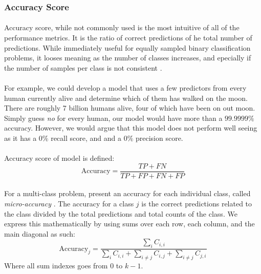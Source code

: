 \documentclass[12pt,letterpaper]{article}
\begin{document}

\subsubsection{Accuracy Score}

\paragraph*{}Accuracy score, while not commonly used is the most intuitive of all of the performance metrics. It is the ratio of correct predictions of he total number of predictions. While immediately useful for equally sampled binary classification problems, it looses meaning as the number of classes increases, and epecially if the number of samples per class is not consistent \cite{Geron}.

\paragraph*{}For example, we could develop a model that uses a few predictors from every human currently alive and determine which of them has walked on the moon. There are roughly 7 billion humans alive, four of which have been on out moon. Simply guess \textit{no} for every human, our model would have more than a $99.9999\%$ accuracy. However, we would argue that this model does not perform well seeing as it has a $0 \%$ recall score, and and a $0 \%$ precision score.

\paragraph*{}Accuracy score of model is defined:
\begin{equation}
\label{eqn-BinaryAccuracy}
\text{Accuracy} = \frac{TP + FN}{TP + FP + FN + FP}
\end{equation}

\paragraph*{}For a multi-class problem, present an accuracy for each individual class, called \textit{micro-accuracy} \cite{James}. The accuracy for a class $j$ is the correct predictions related to the class divided by the total predictions and total counts of the class. We express this mathematically by using sums over each row, each column, and the main diagonal as such:
\begin{equation}
\label{eqn-Accuracy}
\text{Accuracy}_j = \frac{\sum_{i}C_{i,i}}{\sum_{i}C_{i,i} + \sum_{i \neq j}C_{i,j} + \sum_{i \neq j}C_{j,i}}
\end{equation}
Where all sum indexes goes from $0$ to $k-1$.
\end{document}

